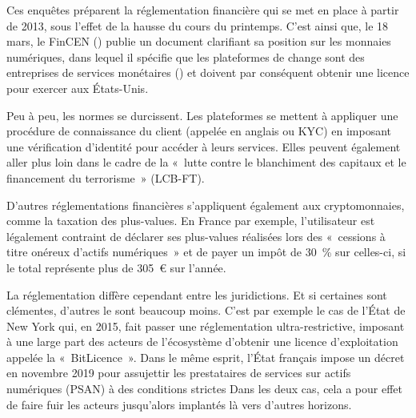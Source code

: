 Ces enquêtes préparent la réglementation financière qui se met en place à partir de 2013, sous l'effet de la hausse du cours du printemps. C'est ainsi que, le 18 mars, le FinCEN () publie un document clarifiant sa position sur les monnaies numériques, dans lequel il spécifie que les plateformes de change sont des entreprises de services monétaires () et doivent par conséquent obtenir une licence pour exercer aux États-Unis.

Peu à peu, les normes se durcissent. Les plateformes se mettent à appliquer une procédure de connaissance du client (appelée en anglais  ou KYC) en imposant une vérification d'identité pour accéder à leurs services. Elles peuvent également aller plus loin dans le cadre de la «~lutte contre le blanchiment des capitaux et le financement du terrorisme~» (LCB-FT).

D'autres réglementations financières s'appliquent également aux cryptomonnaies, comme la taxation des plus-values. En France par exemple, l'utilisateur est légalement contraint de déclarer ses plus-values réalisées lors des «~cessions à titre onéreux d'actifs numériques~» et de payer un impôt de 30~\% sur celles-ci, si le total représente plus de 305~€ sur l'année.

La réglementation diffère cependant entre les juridictions. Et si certaines sont clémentes, d'autres le sont beaucoup moins. C'est par exemple le cas de l'État de New York qui, en 2015, fait passer une réglementation ultra-restrictive, imposant à une large part des acteurs de l'écosystème d'obtenir une licence d'exploitation appelée la «~BitLicence~». Dans le même esprit, l'État français impose un décret en novembre 2019 pour assujettir les prestataires de services sur actifs numériques (PSAN) à des conditions strictes Dans les deux cas, cela a pour effet de faire fuir les acteurs jusqu'alors implantés là vers d'autres horizons.

